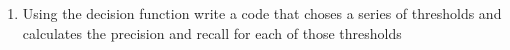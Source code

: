 \documentclass[USenglish,final,authoryear,12pt]{article}
\begin{document}
\begin{enumerate}
	\item Using the decision function write a code that choses a series of thresholds and calculates the precision and recall for each of those thresholds
\end{enumerate}
\end{document}
